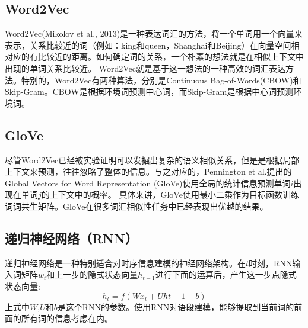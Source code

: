 \subsection{Word2Vec}
Word2Vec(Mikolov et al., 2013\cite{mikolov2013efficient})是一种表达词汇的方法，将一个单词用一个向量来表示，关系比较近的词（例如：king和queen，Shanghai和Beijing）在向量空间相对应的有比较近的距离。如何确定词的关系，一个朴素的想法就是在相似上下文中出现的单词关系比较近。
Word2Vec就是基于这一想法的一种高效的词汇表达方法。特别的，Word2Vec有两种算法，分别是Continuous Bag-of-Words(CBOW)和Skip-Gram。CBOW是根据环境词预测中心词，而Skip-Gram是根据中心词预测环境词。\\
\subsection{GloVe}
尽管Word2Vec已经被实验证明可以发掘出复杂的语义相似关系，但是是根据局部上下文来预测，往往忽略了整体的信息。与之对应的，Pennington et al.\cite{pennington2014glove}提出的Global Vectors for Word Representation (GloVe)使用全局的统计信息预测单词$i$出现在单词$j$的上下文中的概率。
具体来讲，GloVe使用最小二乘作为目标函数训练词词共生矩阵。GloVe在很多词汇相似性任务中已经表现出优越的结果。\\
\subsection{递归神经网络（RNN）}
递归神经网络是一种特别适合对时序信息建模的神经网络架构。在$t$时刻，RNN输入词矩阵$w_t$和上一步的隐式状态向量$h_{t-1}$进行下面的运算后，产生这一步点隐式状态向量\cite{mikolov2010recurrent}:\\
\begin{equation}
h_t = f(Wx_t+Uh{t-1}+b)
\end{equation}
上式中$W$,$U$和$b$是这个RNN的参数。使用RNN对语段建模，能够提取到当前词的前面的所有词的信息考虑在内。

